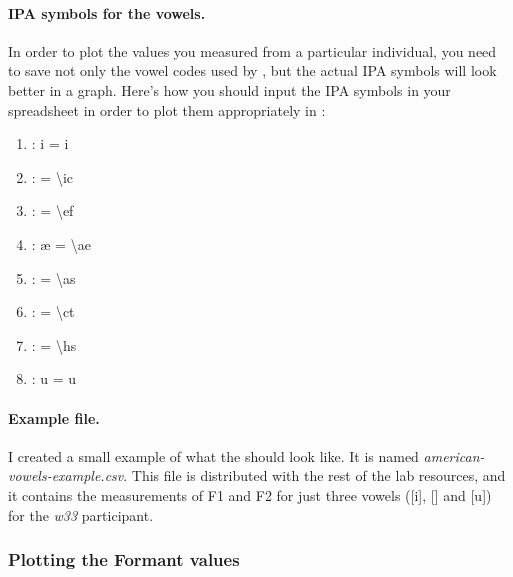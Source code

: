 \paragraph{IPA symbols for the vowels.} In order to plot the values you measured from a particular individual, you need to save not only the vowel codes used by , but the actual IPA symbols will look better in a graph. Here's how you should input the IPA symbols in your spreadsheet in order to plot them appropriately in \Praat{}:

\begin{enumerate}
\item {}: i = i
\item {}: \textsci{} = \textbackslash{}ic
\item {}: \textepsilon{} = \textbackslash{}ef
\item {}: \ae{} = \textbackslash{}ae
\item {}: \textscripta = \textbackslash{}as
\item {}: \textopeno = \textbackslash{}ct
\item {}: \textupsilon{} = \textbackslash{}hs
\item {}: u = u
\end{enumerate}

\paragraph{Example  file.} I created a small example of what the  should look like. It is named \emph{american-vowels-example.csv}. This file is distributed with the rest of the lab resources, and it contains the measurements of F1 and F2 for just three vowels ([i], [\textscripta] and [u]) for the \emph{w33} participant.

\subsubsection{Plotting the Formant values}


